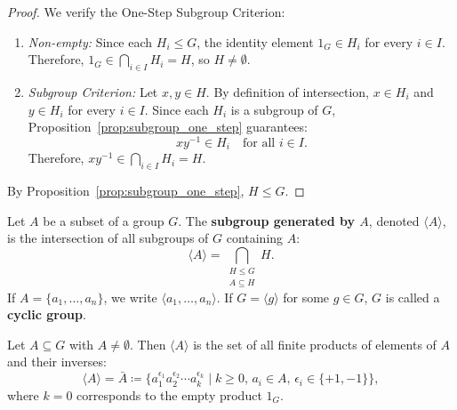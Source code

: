 \begin{proof}
We verify the One-Step Subgroup Criterion:
\begin{enumerate}[label=\arabic*., leftmargin=*]
    \item \emph{Non-empty:} Since each $H_i \le G$, the identity element $1_G \in H_i$ for every $i \in I$.
    Therefore, $1_G \in \bigcap_{i \in I} H_i = H$, so $H \ne \emptyset$.
    
    \item \emph{Subgroup Criterion:} Let $x, y \in H$.
    By definition of intersection, $x \in H_i$ and $y \in H_i$ for every $i \in I$.
    Since each $H_i$ is a subgroup of $G$, Proposition~\ref{prop:subgroup_one_step} guarantees:
    \begin{equation*}
    xy^{-1} \in H_i \quad \text{for all } i \in I.
    \end{equation*}
    Therefore, $xy^{-1} \in \bigcap_{i \in I} H_i = H$.
\end{enumerate}
By Proposition~\ref{prop:subgroup_one_step}, $H \le G$.
\end{proof}

\begin{definition}
Let $A$ be a subset of a group $G$. The \textbf{subgroup generated by $A$}, denoted $\langle A \rangle$, is the intersection of all subgroups of $G$ containing $A$:
\begin{equation}
\langle A \rangle = \bigcap_{\substack{H \le G \\ A \subseteq H}} H.
\end{equation}
If $A = \{a_1, \dots, a_n\}$, we write $\langle a_1, \dots, a_n \rangle$. If $G = \langle g \rangle$ for some $g \in G$, $G$ is called a \textbf{cyclic group}.
\end{definition}

\begin{theorem}
\label{thm:generated_subgroup_explicit}
Let $A \subseteq G$ with $A \ne \emptyset$. Then $\langle A \rangle$ is the set of all finite products of elements of $A$ and their inverses:
\begin{equation}
\langle A \rangle = \bar{A} \coloneqq \{ a_1^{\epsilon_1} a_2^{\epsilon_2} \cdots a_k^{\epsilon_k} \mid k \ge 0, \, a_i \in A, \, \epsilon_i \in \{+1, -1\} \},
\end{equation}
where $k = 0$ corresponds to the empty product $1_G$.
\end{theorem}

